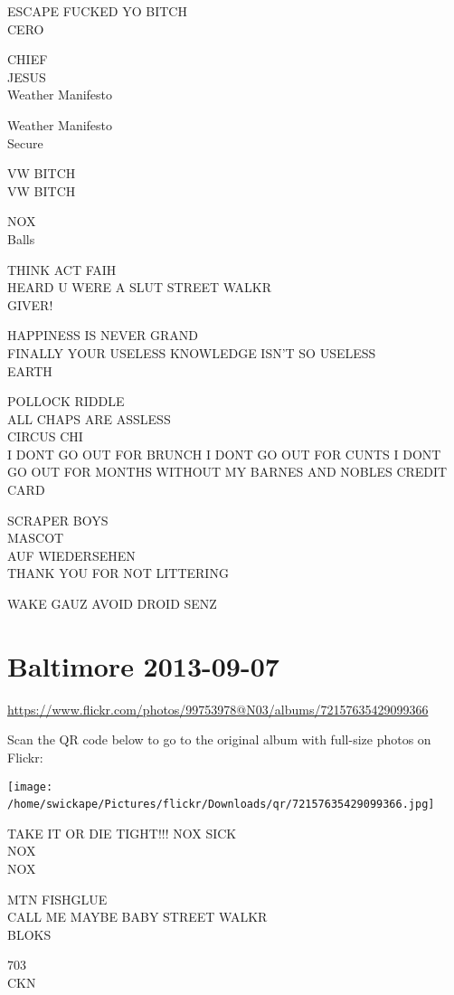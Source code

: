 \documentclass[10pt,letterpaper]{article}
\begin{document}
ESCAPE FUCKED YO BITCH\\
CERO

CHIEF\\
JESUS\\
Weather Manifesto

Weather Manifesto\\
Secure

VW BITCH\\
VW BITCH

NOX\\
Balls

THINK ACT FAIH\\
HEARD U WERE A SLUT STREET WALKR\\
GIVER!

HAPPINESS IS NEVER GRAND\\
FINALLY YOUR USELESS KNOWLEDGE ISN'T SO USELESS\\
EARTH

POLLOCK RIDDLE\\
ALL CHAPS ARE ASSLESS\\
CIRCUS CHI\\
I DONT GO OUT FOR BRUNCH I DONT GO OUT FOR CUNTS I DONT GO OUT FOR MONTHS WITHOUT MY BARNES AND NOBLES CREDIT CARD

SCRAPER BOYS\\
MASCOT\\
AUF WIEDERSEHEN\\
THANK YOU FOR NOT LITTERING

WAKE GAUZ AVOID DROID SENZ
\

\section*{Baltimore 2013-09-07}

\url{https://www.flickr.com/photos/99753978@N03/albums/72157635429099366}

Scan the QR code below to go to the original album with full-size photos on Flickr:

\texttt{[image: /home/swickape/Pictures/flickr/Downloads/qr/72157635429099366.jpg]}
\

TAKE IT OR DIE TIGHT!!! NOX SICK\\
NOX\\
NOX

MTN FISHGLUE\\
CALL ME MAYBE BABY STREET WALKR\\
BLOKS

703\\
CKN
\end{document}
